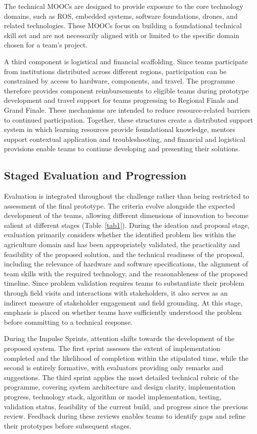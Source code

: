 \documentclass[runningheads]{llncs}
\begin{document}
The technical MOOCs are designed to provide exposure to the core technology domains, such as ROS, embedded systems, software foundations, drones, and related technologies. These MOOCs focus on building a foundational technical skill set and are not necessarily aligned with or limited to the specific domain chosen for a team's project.

A third component is logistical and financial scaffolding. Since teams participate from institutions distributed across different regions, participation can be constrained by access to hardware, components, and travel. The programme therefore provides component reimbursements to eligible teams during prototype development and travel support for teams progressing to Regional Finals and Grand Finale. These mechanisms are intended to reduce resource-related barriers to continued participation. Together, these structures create a distributed support system in which learning resources provide foundational knowledge, mentors support contextual application and troubleshooting, and financial and logistical provisions enable teams to continue developing and presenting their solutions.

\subsection{Staged Evaluation and Progression}

Evaluation is integrated throughout the challenge rather than being restricted to assessment of the final prototype. The criteria evolve alongside the expected development of the teams, allowing different dimensions of innovation to become salient at different stages (Table~\ref{tab1}). During the ideation and proposal stage, evaluation primarily considers whether the identified problem lies within the agriculture domain and has been appropriately validated, the practicality and feasibility of the proposed solution, and the technical readiness of the proposal, including the relevance of hardware and software specifications, the alignment of team skills with the required technology, and the reasonableness of the proposed timeline. Since problem validation requires teams to substantiate their problem through field visits and interactions with stakeholders, it also serves as an indirect measure of stakeholder engagement and field grounding. At this stage, emphasis is placed on whether teams have sufficiently understood the problem before committing to a technical response.

During the Impulse Sprints, attention shifts towards the development of the proposed system. The first sprint assesses the extent of implementation completed and the likelihood of completion within the stipulated time, while the second is entirely formative, with evaluators providing only remarks and suggestions. The third sprint applies the most detailed technical rubric of the programme, covering system architecture and design clarity, implementation progress, technology stack, algorithm or model implementation, testing, validation status, feasibility of the current build, and progress since the previous review. Feedback during these reviews enables teams to identify gaps and refine their prototypes before subsequent stages.
\end{document}
